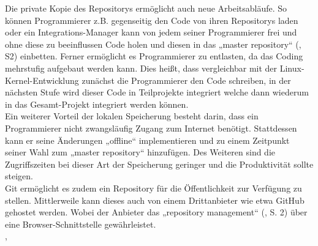 Die private Kopie des Repositorys ermöglicht auch neue Arbeitsabläufe. So können Programmierer z.B. gegenseitig den Code von ihren Repositorys laden oder ein Integrations-Manager kann von jedem seiner Programmierer frei und ohne diese zu beeinflussen Code holen und diesen in das „master repository“ (\cite{git_tool}, S2) einbetten. Ferner ermöglicht es Programmierer zu entlasten, da das Coding mehrstufig aufgebaut werden kann. Dies heißt, dass vergleichbar mit der Linux-Kernel-Entwicklung zunächst die Programmierer den Code schreiben, in der nächsten Stufe wird dieser Code in Teilprojekte integriert welche dann wiederum in das Gesamt-Projekt integriert werden können.
\\
Ein weiterer Vorteil der lokalen Speicherung besteht darin, dass ein Programmierer nicht zwangsläufig Zugang zum Internet benötigt. Stattdessen kann er seine Änderungen „offline“ implementieren und zu einem Zeitpunkt seiner Wahl zum „master repository“  hinzufügen. Des Weiteren sind die Zugriffszeiten bei dieser Art der Speicherung geringer und die Produktivität sollte steigen.
\\
Git ermöglicht es zudem ein Repository für die Öffentlichkeit zur Verfügung zu stellen. Mittlerweile kann dieses auch von einem Drittanbieter wie etwa GitHub gehostet werden. Wobei der Anbieter das „repository management“ (\cite{git_tool}, S. 2) über eine Browser-Schnittstelle gewährleistet. 
\\
\cite{git_scm}, \cite{git_tool}

